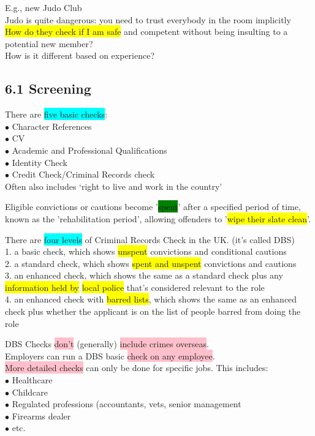\documentclass[tikz,border=10pt]{project_plan}
\newcommand{\bulletPoint}{\hspace{-3.1pt}$\bullet$ \hspace{5pt}}
\begin{document}
E.g., new Judo Club\\
Judo is quite dangerous: you need to trust everybody in the room implicitly\\
\colorbox{yellow}{How do they check if I am safe} and competent without being insulting to a potential new member?\\
How is it different based on experience?

\newpage

\subsection{6.1 Screening}

There are \colorbox{cyan}{five basic checks}:\\
\bulletPoint Character References\\
\bulletPoint CV \\
\bulletPoint Academic and Professional Qualifications\\
\bulletPoint Identity Check\\
\bulletPoint Credit Check/Criminal Records check\\
Often also includes ‘right to live and work in the country’

Eligible convictions or cautions become '\colorbox{green}{spent}' after a specified period of
time, known as the 'rehabilitation period', allowing offenders to '\colorbox{yellow}{wipe their slate clean}'.

There are \colorbox{cyan}{four levels} of Criminal Records Check in the UK. (it’s called DBS) \\
1. a basic check, which shows \colorbox{yellow}{unspent} convictions and conditional cautions\\
2. a standard check, which shows \colorbox{yellow}{spent and unspent} convictions and cautions\\
3. an enhanced check, which shows the same as a standard check plus any
\colorbox{yellow}{information held by} \colorbox{yellow}{local police} that’s considered relevant to the role\\
4. an enhanced check with \colorbox{yellow}{barred lists}, which shows the same as an enhanced
check plus whether the applicant is on the list of people barred from doing the role

DBS Checks \colorbox{pink}{don’t} (generally) \colorbox{pink}{include crimes overseas}. \\
Employers can run a DBS basic \colorbox{pink}{check on any employee}.\\
\colorbox{pink}{More detailed checks} can only be done for specific jobs.  This includes: \\
\bulletPoint Healthcare \\
\bulletPoint Childcare \\
\bulletPoint Regulated professions (accountants, vets, senior management\\
\bulletPoint Firearms dealer\\
\bulletPoint etc.
\end{document}
